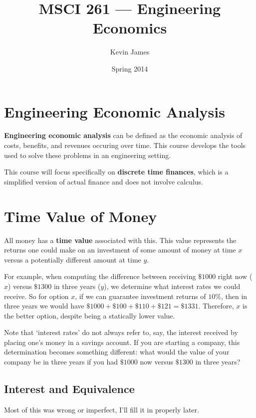 \documentclass[12pt]{article}
\begin{document}
\title{MSCI 261 --- Engineering Economics}
\author{Kevin James}
\date{\vspace{-2ex}Spring 2014}
\maketitle\HRule

\section{Engineering Economic Analysis}
{\bf Engineering economic analysis} can be defined as the economic analysis of costs, benefits, and revenues occuring over time. This course develops the tools used to solve these problems in an engineering setting.

This course will focus specifically on {\bf discrete time finances}, which is a simplified version of actual finance and does not involve calculus.

\section{Time Value of Money}
All money has a {\bf time value} associated with this. This value represents the returns one could make on an investment of some amount of money at time $x$ versus a potentially different amount at time $y$.

For example, when computing the difference between receiving $\$1000$ right now ($x$) versus $\$1300$ in three years ($y$), we determine what interest rates we could receive. So for option $x$, if we can guarantee investment returns of $10\%$, then in three years we would have $\$1000 + \$100 + \$110 + \$121 = \$1331$. Therefore, $x$ is the better option, despite being a statically lower value.

Note that `interest rates' do not always refer to, say, the interest received by placing one's money in a savings account. If you are starting a company, this determination becomes something different: what would the value of your company be in three years if you had $\$1000$ now versus $\$1300$ in three years?

\subsection{Interest and Equivalence}
Most of this was wrong or imperfect, I'll fill it in properly later.
\end{document}
